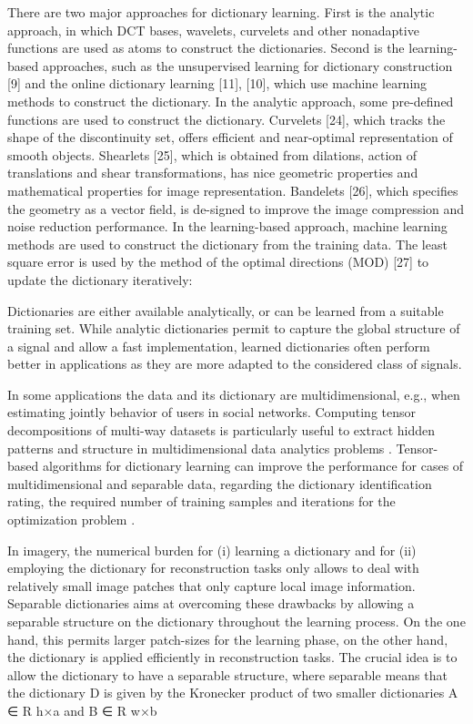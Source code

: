 There are two major approaches for dictionary learning. First is the analytic approach, in which DCT bases, wavelets, curvelets and other nonadaptive functions are used as atoms to construct the dictionaries. Second is the learning-based approaches, such as the unsupervised learning for dictionary construction [9] and the online dictionary learning [11], [10], which use machine learning methods to construct the dictionary. In the analytic approach, some pre-defined functions are used to construct the dictionary. Curvelets [24], which tracks the shape of the discontinuity set, offers efficient and near-optimal representation of smooth objects. Shearlets [25], which is obtained from dilations, action of translations and shear transformations, has nice geometric properties and mathematical properties for image representation. Bandelets [26], which specifies the geometry as a vector field, is de-signed to improve the image compression and noise reduction performance. In the learning-based approach, machine learning methods are used to construct the dictionary from the training data. The least square error is used by the method of the optimal directions (MOD) [27] to update the dictionary iteratively:

Dictionaries are either available analytically, or can be learned from a suitable training set. While analytic dictionaries permit to capture the global structure of a signal and allow a fast implementation, learned dictionaries often perform better in applications as they are more adapted to the considered class of signals.

In some applications the data and its dictionary are multidimensional, e.g., when estimating jointly behavior of users in social networks. Computing tensor decompositions of multi-way datasets is particularly useful to extract hidden patterns and structure in multidimensional data analytics problems \cite{kolda2009tensor}. Tensor-based algorithms for dictionary learning can improve the performance for cases of multidimensional and separable data, regarding the dictionary identification rating, the required number of training samples and iterations for the optimization problem \cite{roemer2014tensor}.

In imagery, the numerical burden for (i) learning a dictionary and for (ii) employing the dictionary for reconstruction tasks only allows to deal with relatively small image patches that only capture local image information. Separable dictionaries aims at overcoming these drawbacks by allowing a separable structure on the dictionary throughout the learning process. On the one hand, this permits larger patch-sizes for the learning phase, on the other hand, the dictionary is applied efficiently in reconstruction tasks. The crucial idea is to allow the dictionary to have a separable structure, where separable means that the dictionary D is given by the Kronecker product of two smaller dictionaries A ∈ R h×a and B ∈ R w×b


